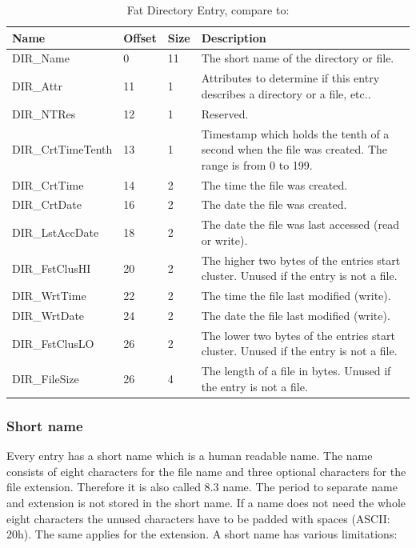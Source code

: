 \begin{table}[!ht]
\caption{Fat Directory Entry, compare to: \cite{usb_ms_jan, fatgen103}}
\centering
\begin{tabular}{|l|l|l|p{8.5cm}|}
\hline\hline
\textbf{Name} & \textbf{Offset} & \textbf{Size} & \textbf{Description}\\ \hline
DIR\_Name & 0 & 11 & The short name of the directory or file. \\ \hline
DIR\_Attr & 11 & 1 & Attributes to determine if this entry describes a directory or a file, etc.. \\ \hline
DIR\_NTRes & 12 & 1 & Reserved. \\ \hline
DIR\_CrtTimeTenth & 13 & 1 & Timestamp which holds the tenth of a second when the file was created. The range is from 0 to 199. \\ \hline
DIR\_CrtTime & 14 & 2 & The time the file was created. \\ \hline
DIR\_CrtDate & 16 & 2 & The date the file was created. \\ \hline
DIR\_LstAccDate & 18 & 2 & The date the file was last accessed (read or write). \\ \hline
DIR\_FstClusHI & 20 & 2 & The higher two bytes of the entries start cluster. Unused if the entry is not a file. \\ \hline
DIR\_WrtTime & 22 & 2 & The time the file last modified (write). \\ \hline
DIR\_WrtDate & 24 & 2 & The date the file last modified (write). \\ \hline
DIR\_FstClusLO & 26 & 2 & The lower two bytes of the entries start cluster. Unused if the entry is not a file. \\ \hline
DIR\_FileSize & 26 & 4 & The length of a file in bytes. Unused if the entry is not a file. \\ \hline
\end{tabular}
\label{table:fat_dir_entry}
\end{table}

\subsubsection{Short name}

Every entry has a short name which is a human readable name. The name consists of eight characters for the file name and three optional characters for the file extension. Therefore it is also called 8.3 name. The period to separate name and extension is not stored in the short name. If a name does not need the whole eight characters the unused characters have to be padded with spaces (ASCII: 20h). The same applies for the extension. A short name has various limitations\cite{usb_ms_jan}:

